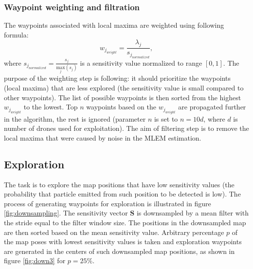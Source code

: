 \subsubsection{Waypoint weighting and filtration}
The waypoints associated with local maxima are weighted using following formula:
\begin{equation}
  w_{j_{weight}} = \frac{\lambda_{j}}{    s_{j_{normalized}} },
\end{equation}
where $s_{j_{normalized}} = \frac{ s_{j} }{ \underset{j}{\mathrm{max}}(s_{j})}$ is a sensitivity value normalized to range $[0, 1]$.
The purpose of the weighting step is following: it should prioritize the waypoints (local maxima) that are less explored (the sensitivity value is small compared to other waypoints).
The list of possible waypoints is then sorted from the highest $w_{j_{weight}}$ to the lowest.
Top $n$ waypoints based on the $w_{j_{weight}}$ are propagated further in the algorithm, the rest is ignored (parameter $n$ is set to $n = 10d$, where $d$ is number of drones used for exploitation).
The aim of filtering step is to remove the local maxima that were caused by noise in the \ac{MLEM} estimation.%

\subsection{Exploration}
The task is to explore the map positions that have low sensitivity values (the probability that particle emitted from such position to be detected is low).
The process of generating waypoints for exploration is illustrated in figure \ref{fig:downsampling}.
The sensitivity vector $\mathbf{S}$ is downsampled by a mean filter with the stride equal to the filter window size.
The positions in the downsampled map are then sorted based on the mean sensitivity value.
Arbitrary percentage $p$ of the map poses with lowest sensitivity values is taken and exploration waypoints are generated in the centers of such downsampled map positions, as shown in figure \ref{fig:down3} for $p = 25\%$.

